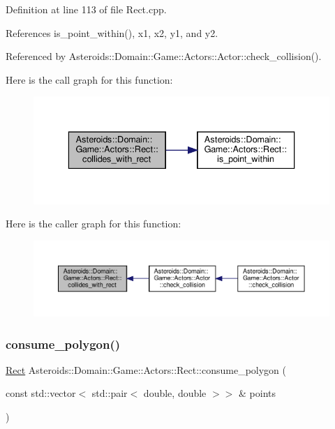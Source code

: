Definition at line 113 of file Rect.\+cpp.



References is\+\_\+point\+\_\+within(), x1, x2, y1, and y2.



Referenced by Asteroids\+::\+Domain\+::\+Game\+::\+Actors\+::\+Actor\+::check\+\_\+collision().

Here is the call graph for this function\+:\nopagebreak
\begin{figure}[H]
\begin{center}
\leavevmode
\includegraphics[width=336pt]{classAsteroids_1_1Domain_1_1Game_1_1Actors_1_1Rect_acc14c3d293e2bfd3b55aa6e727457bf0_cgraph}
\end{center}
\end{figure}
Here is the caller graph for this function\+:\nopagebreak
\begin{figure}[H]
\begin{center}
\leavevmode
\includegraphics[width=350pt]{classAsteroids_1_1Domain_1_1Game_1_1Actors_1_1Rect_acc14c3d293e2bfd3b55aa6e727457bf0_icgraph}
\end{center}
\end{figure}
\mbox{\label{classAsteroids_1_1Domain_1_1Game_1_1Actors_1_1Rect_a687d0848c13d1b8dfbd2f896636b4145}} 
\subsubsection{\texorpdfstring{consume\+\_\+polygon()}{consume\_polygon()}}
{\footnotesize\ttfamily \hyperlink{classAsteroids_1_1Domain_1_1Game_1_1Actors_1_1Rect}{Rect} Asteroids\+::\+Domain\+::\+Game\+::\+Actors\+::\+Rect\+::consume\+\_\+polygon (\begin{DoxyParamCaption}\item[{const std\+::vector$<$ std\+::pair$<$ double, double $>$$>$ \&}]{points }\end{DoxyParamCaption})\hspace{0.3cm}{\ttfamily [static]}}



